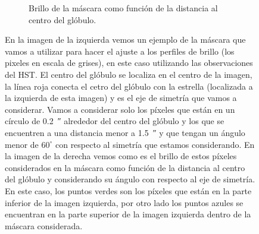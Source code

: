 \documentclass{book}
\begin{document}
\begin{figure}[htb]
\begin{subfigure}[b]{0.5\textwidth}
    \caption{Brillo de la máscara como función de la distancia al centro del glóbulo.}
    \label{fig:f2}
  \end{subfigure}
  \caption{En la imagen de la izquierda vemos un ejemplo de la máscara que vamos a utilizar para hacer el ajuste a los perfiles de brillo (los pixeles en escala de grises), en este caso utilizando las observaciones del HST. El centro del glóbulo se localiza en el centro de la imagen, la línea roja conecta el cetro del glóbulo con la estrella (localizada a la izquierda de esta imagen) y es el eje de simetría que vamos a considerar. Vamos a considerar solo los píxeles que están en un círculo de \SI{0.2}{\arcsecond} alrededor del centro del glóbulo y los que se encuentren a una distancia menor a \SI{1.5}{\arcsecond} y que tengan un ángulo menor de $60^\circ$ con respecto al simetría que estamos considerando. En la imagen de la derecha vemos como es el brillo de estos píxeles considerados en la máscara como función de la distancia al centro del glóbulo y considerando su ángulo con respecto al eje de simetría. En este caso, los puntos verdes son los píxeles que están en la parte inferior de la imagen izquierda, por otro lado los puntos azules se encuentran en la parte superior de la imagen izquierda dentro de la máscara considerada.}
  \label{ejemplo mascara}
\end{figure}
\end{document}

